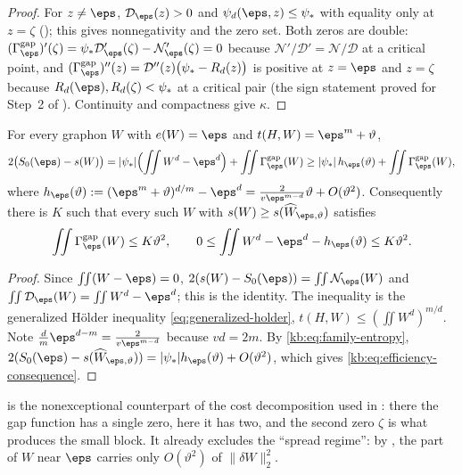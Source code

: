 \begin{proof}
For $z\ne\eps$, $\mathcal D_\eps(z)>0$ and $\psi_d(\eps,z)\le\psi_*$ with
equality only at $z=\zeta$ (); this gives
nonnegativity and the zero set.  Both zeros are double:
$(\Gamma^{\mathrm{gap}}_\eps)'(\zeta)=\psi_*\mathcal D_\eps'(\zeta)
-\mathcal N_\eps'(\zeta)=0$ because $\mathcal N'/\mathcal D'=\mathcal N/\mathcal D$ at
a critical point, and
$(\Gamma^{\mathrm{gap}}_\eps)''(z)=\mathcal D''(z)\bigl(\psi_*-R_d(z)\bigr)$ is
positive at $z=\eps$ and $z=\zeta$ because $R_d(\eps),R_d(\zeta)<\psi_*$ at a
critical pair (the sign statement proved for Step~2 of
).  Continuity and compactness give $\kappa$.
\end{proof}

\begin{lemma}\label{kb:lem:efficiency}
For every graphon $W$ with $e(W)=\eps$ and $t(H,W)=\eps^m+\vartheta$,
\begin{equation}\label{kb:eq:efficiency}
  2\bigl(S_0(\eps)-s(W)\bigr)
  =|\psi_*|\Bigl(\iint W^d-\eps^d\Bigr)+\iint\Gamma^{\mathrm{gap}}_\eps(W)
  \ge|\psi_*|\,h_\eps(\vartheta)+\iint\Gamma^{\mathrm{gap}}_\eps(W),
\end{equation}
where $h_\eps(\vartheta):=(\eps^m+\vartheta)^{d/m}-\eps^d
=\frac2{v\eps^{m-d}}\vartheta+O(\vartheta^2)$.  Consequently there is $K$ such
that every such $W$ with $s(W)\ge s(\widehat W_{\eps,\vartheta})$ satisfies
\begin{equation}\label{kb:eq:efficiency-consequence}
  \iint\Gamma^{\mathrm{gap}}_\eps(W)\le K\vartheta^2,
  \qquad
  0\le\iint W^d-\eps^d-h_\eps(\vartheta)\le K\vartheta^2 .
\end{equation}
\end{lemma}

\begin{proof}
Since $\iint(W-\eps)=0$, $2(s(W)-S_0(\eps))=\iint\mathcal N_\eps(W)$ and
$\iint\mathcal D_\eps(W)=\iint W^d-\eps^d$; this is the identity.  The
inequality is the generalized H\"older inequality
\eqref{eq:generalized-holder}, $t(H,W)\le(\iint W^d)^{m/d}$.  Note
$\frac dm\eps^{d-m}=\frac2{v\eps^{m-d}}$ because $vd=2m$.  By
\eqref{kb:eq:family-entropy},
$2(S_0(\eps)-s(\widehat W_{\eps,\vartheta}))=|\psi_*|h_\eps(\vartheta)+O(\vartheta^2)$,
which gives \eqref{kb:eq:efficiency-consequence}.
\end{proof}

\begin{remark}
 is the nonexceptional counterpart of the cost
decomposition used in : there the gap
function has a single zero, here it has two, and the second zero $\zeta$ is
what produces the small block.  It already excludes the ``spread regime'':
by , the part of $W$ near $\eps$ carries only
$O(\vartheta^2)$ of $\|\delta W\|_2^2$.
\end{remark}

